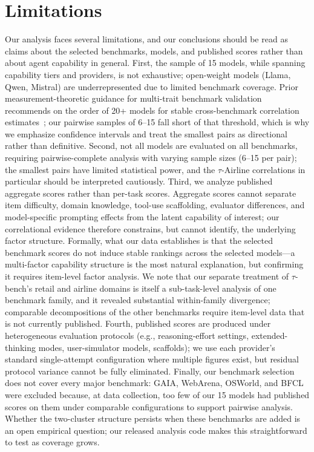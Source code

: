 \documentclass[11pt]{article}
\begin{document}
\section*{Limitations}
Our analysis faces several limitations, and our conclusions should be read as claims about the selected benchmarks, models, and published scores rather than about agent capability in general. First, the sample of 15 models, while spanning capability tiers and providers, is not exhaustive; open-weight models (Llama, Qwen, Mistral) are underrepresented due to limited benchmark coverage. Prior measurement-theoretic guidance for multi-trait benchmark validation recommends on the order of 20+ models for stable cross-benchmark correlation estimates~\cite{evaleval}; our pairwise samples of 6--15 fall short of that threshold, which is why we emphasize confidence intervals and treat the smallest pairs as directional rather than definitive. Second, not all models are evaluated on all benchmarks, requiring pairwise-complete analysis with varying sample sizes (6--15 per pair); the smallest pairs have limited statistical power, and the $\tau$-Airline correlations in particular should be interpreted cautiously. Third, we analyze published aggregate scores rather than per-task scores. Aggregate scores cannot separate item difficulty, domain knowledge, tool-use scaffolding, evaluator differences, and model-specific prompting effects from the latent capability of interest; our correlational evidence therefore constrains, but cannot identify, the underlying factor structure. Formally, what our data establishes is that the selected benchmark scores do not induce stable rankings across the selected models---a multi-factor capability structure is the most natural explanation, but confirming it requires item-level factor analysis. We note that our separate treatment of $\tau$-bench's retail and airline domains is itself a sub-task-level analysis of one benchmark family, and it revealed substantial within-family divergence; comparable decompositions of the other benchmarks require item-level data that is not currently published. Fourth, published scores are produced under heterogeneous evaluation protocols (e.g., reasoning-effort settings, extended-thinking modes, user-simulator models, scaffolds); we use each provider's standard single-attempt configuration where multiple figures exist, but residual protocol variance cannot be fully eliminated. Finally, our benchmark selection does not cover every major benchmark: GAIA, WebArena, OSWorld, and BFCL were excluded because, at data collection, too few of our 15 models had published scores on them under comparable configurations to support pairwise analysis. Whether the two-cluster structure persists when these benchmarks are added is an open empirical question; our released analysis code makes this straightforward to test as coverage grows.
\end{document}
